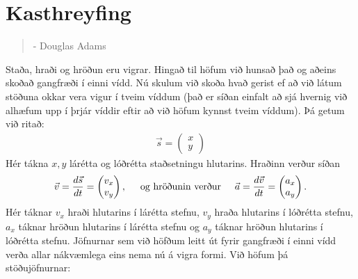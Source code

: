 \ifdefined \wholebook \else\documentclass[oneside]{book}\usepackage{EdlBook}\graphicspath{{figures/}}
\begin{document}
%
\setcounter{chapter}{4} %
%
\fi

\renewcommand{\thefigure}{\arabic{figure}}


\chapter{Kasthreyfing}

\begin{quote}
    \textit{}
    \begin{flushright}
    - Douglas Adams
    \end{flushright}
\end{quote}

Staða, hraði og hröðun eru vigrar. Hingað til höfum við hunsað það og aðeins skoðað gangfræði í einni vídd. Nú skulum við skoða hvað gerist ef að við látum stöðuna okkar vera vigur í tveim víddum (það er síðan einfalt að sjá hvernig við alhæfum upp í þrjár víddir eftir að við höfum kynnst tveim víddum). Þá getum við ritað:
\begin{align*}
\vec{s} = \begin{pmatrix}
x \\
y
\end{pmatrix}
\end{align*}
Hér tákna $x,y$ lárétta og lóðrétta staðsetningu hlutarins. Hraðinn verður síðan
\begin{align*}
\vec{v} = \frac{d\vec{s}}{dt} = \begin{pmatrix}
v_x \\
v_y
\end{pmatrix}, \hspace{0.5cm} \text{og hröðunin verður} \hspace{0.5cm} \vec{a} = \frac{d\vec{v}}{dt} = \begin{pmatrix}
a_x \\
a_y
\end{pmatrix}.
\end{align*}
Hér táknar $v_x$ hraði hlutarins í lárétta stefnu, $v_y$ hraða hlutarins í lóðrétta stefnu, $a_x$ táknar hröðun hlutarins í lárétta stefnu og $a_y$ táknar hröðun hlutarins í lóðrétta stefnu. Jöfnurnar sem við höfðum leitt út fyrir gangfræði í einni vídd verða allar nákvæmlega eins nema nú á vigra formi. Við höfum þá stöðujöfnurnar:
\end{document}
